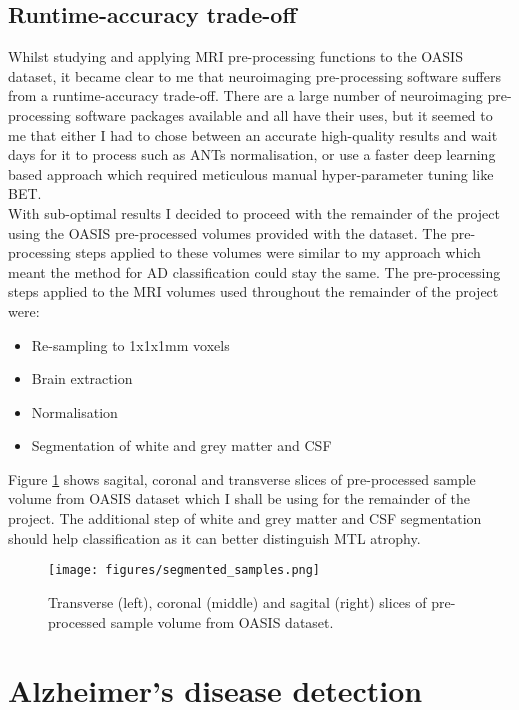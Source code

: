 \documentclass[
    author={Kai Hulme},
    supervisor={Dr Jon Bird},
    degree={BSc},
    title={Generative Adversarial Networks as an Augmentation Technique},
    subtitle={for Alzheimer's Disease Detection in MRI Volumes},
    type={Research},
    year={2021} 
]{dissertation}
\begin{document}
\subsection{Runtime-accuracy trade-off}

Whilst studying and applying MRI pre-processing functions to the OASIS dataset, it became clear to me that neuroimaging pre-processing software suffers from a runtime-accuracy trade-off. There are a large number of neuroimaging pre-processing software packages available and all have their uses, but it seemed to me that either I had to chose between an accurate high-quality results and wait days for it to process such as ANTs normalisation, or use a faster deep learning based approach which required meticulous manual hyper-parameter tuning like BET. \\

With sub-optimal results I decided to proceed with the remainder of the project using the OASIS pre-processed volumes provided with the dataset. The pre-processing steps applied to these volumes were similar to my approach which meant the method for AD classification could stay the same. The pre-processing steps applied to the MRI volumes used throughout the remainder of the project were:

\begin{itemize}
    \item Re-sampling to 1x1x1mm voxels
    \item Brain extraction
    \item Normalisation
    \item Segmentation of white and grey matter and CSF
\end{itemize}

Figure \ref{segmented_samples} shows sagital, coronal and transverse slices of pre-processed sample volume from OASIS dataset which I shall be using for the remainder of the project. The additional step of white and grey matter and CSF segmentation should help classification as it can better distinguish MTL atrophy. 

\begin{figure}[t]
    \centering
    \texttt{[image: figures/segmented\_samples.png]}
    \caption{Transverse (left), coronal (middle) and sagital (right) slices of pre-processed sample volume from OASIS dataset.}
    \label{segmented_samples}
\end{figure}

	
\section{Alzheimer's disease detection}
\label{ad_detection_implemetation}
\end{document}
